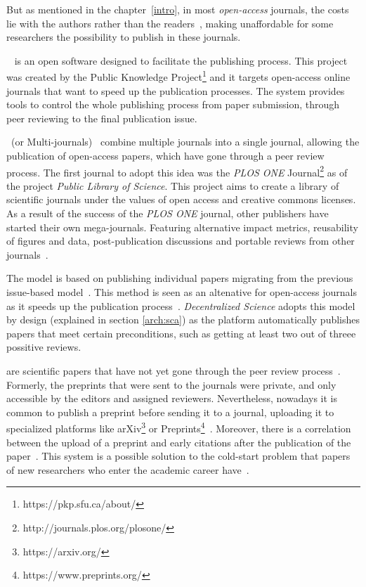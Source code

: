 But as mentioned in the chapter~\ref{intro}, in most \emph{open-access}
journals, the costs lie with the authors rather than the
readers~\cite{lariviere2015oligopoly,van2013true}, making unaffordable for some
researchers the possibility to publish in these journals.

~\cite{willinsky2005open} is an open software designed
to facilitate the publishing process. This project was created by the Public
Knowledge Project\footnote{https://pkp.sfu.ca/about/} and it targets open-access
online journals that want to speed up the publication processes. The system
provides tools to control the whole publishing process from paper submission,
through peer reviewing to the final publication issue.

~(or Multi-journals)~\cite{binfield2013open,wellen2013open}
combine multiple journals into a single journal, allowing the publication of
open-access papers, which have gone through a peer review process. The first
journal to adopt this idea was the \emph{PLOS ONE}
Journal\footnote{http://journals.plos.org/plosone/} as of the project
\emph{Public Library of Science}. This project aims to create a library of
scientific journals under the values of open access and creative commons
licenses. As a result of the success of the \emph{PLOS ONE} journal, other
publishers have started their own mega-journals. Featuring alternative impact
metrics, reusability of figures and data, post-publication discussions and
portable reviews from other journals~\cite{bjork2015have}.

The  model is based on publishing individual papers
migrating from the previous issue-based model~\cite{anderton2013continuous}.
This method is seen as an altenative for open-access journals as it speeds up
the publication process~\cite{haymanview}. \emph{Decentralized Science} adopts
this model by design (explained in section \ref{arch:sca}) as the platform
automatically publishes papers that meet certain preconditions, such as getting
at least two out of threee possitive reviews.

 are scientific papers that have not yet gone through the peer
review process~\cite{harnad2003electronic}. Formerly, the preprints that were
sent to the journals were private, and only accessible by the editors and
assigned reviewers. Nevertheless, nowadays it is common to publish a preprint
before sending it to a journal, uploading it to specialized platforms like
arXiv\footnote{https://arxiv.org/} or
Preprints\footnote{https://www.preprints.org/}~\cite{brown2001volution}.
Moreover, there is a correlation between the upload of a preprint and early
citations after the publication of the paper~\cite{shuai2012scientific}. This
system is a possible solution to the cold-start problem that papers of new
researchers who enter the academic career have~\cite{sugiyama2010scholarly}.

